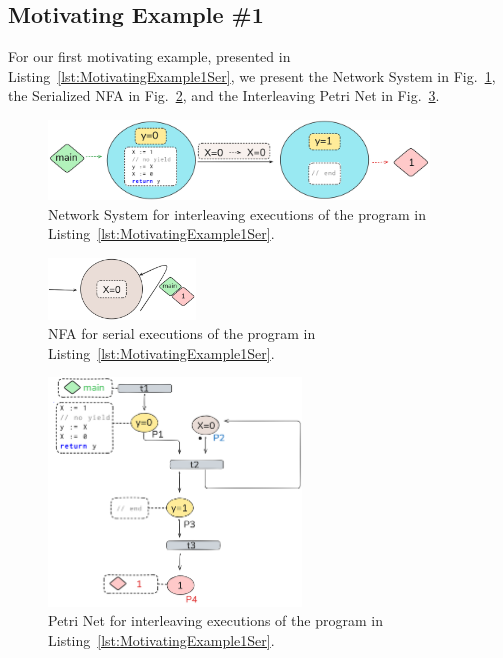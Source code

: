\subsection{Motivating Example \#1}
\label{appendix:subsec::Ex1A:NS}


For our first motivating example, presented in Listing~\ref{lst:MotivatingExample1Ser}, we present the Network System in Fig.~\ref{fig:code1ExampleNS}, the Serialized NFA in Fig.~\ref{fig:code1ExampleNFA}, and the Interleaving Petri Net in Fig.~\ref{fig:code1ExamplePN}.



\begin{figure}[!htbp]
	\centering
	\includegraphics[width=0.9\textwidth]{plots/code_1_NS.png}
	\caption{Network System for interleaving executions of the program in Listing~\ref{lst:MotivatingExample1Ser}.}
	\label{fig:code1ExampleNS}
\end{figure}


\begin{figure}[!htbp]
	\centering
	\includegraphics[width=0.35\textwidth]{plots/code_1_NFA.png}
	\caption{NFA for serial executions of the program in Listing~\ref{lst:MotivatingExample1Ser}.}
	\label{fig:code1ExampleNFA}
\end{figure}



\begin{figure}[H]
	\centering
	\includegraphics[width=0.6\textwidth]{plots/code_1_PN_with_annotation.png}
	\caption{Petri Net for interleaving executions of the program in Listing~\ref{lst:MotivatingExample1Ser}.}
	\label{fig:code1ExamplePN}
\end{figure}

